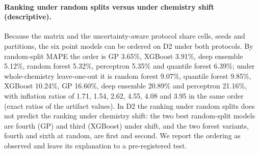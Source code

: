 \documentclass[11pt,a4paper]{article}
\begin{document}
\paragraph{Ranking under random splits versus under chemistry shift
(descriptive).} Because the matrix and the uncertainty-aware protocol share
cells, seeds and partitions, the six point models can be ordered on D2 under
both protocols. By random-split MAPE the order is GP 3.65\%, XGBoost
3.91\%, deep ensemble 5.12\%, random forest 5.32\%, perceptron 5.35\% and
quantile forest 6.39\%; under whole-chemistry leave-one-out it is random
forest 9.07\%, quantile forest 9.85\%, XGBoost 10.24\%, GP 16.60\%, deep
ensemble 20.89\% and perceptron 21.16\%, with inflation ratios of 1.71,
1.54, 2.62, 4.55, 4.08 and 3.95 in the same order (exact ratios of the
artifact values). In D2 the ranking under
random splits does not predict the ranking under chemistry shift: the two
best random-split models are fourth (GP) and third (XGBoost) under shift, and the two forest
variants, fourth and sixth at random, are first and second. We report the
ordering as observed and leave its explanation to a pre-registered test.
\end{document}

